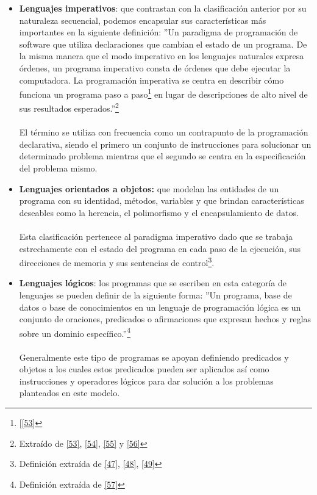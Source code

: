 \begin{itemize}
        \item  \textbf{Lenguajes imperativos}: que contrastan con la clasificación anterior por su naturaleza secuencial, podemos encapsular sus características más importantes en la siguiente definición: 
         ''Un paradigma de programación de software que utiliza declaraciones que cambian el estado de un programa. De la misma manera que el modo imperativo en los lenguajes naturales expresa órdenes, un programa imperativo consta de órdenes que debe ejecutar la computadora. La programación imperativa se centra en describir cómo funciona un programa paso a paso\footnote{[\hyperlink{53}{[53]}} en lugar de descripciones de alto nivel de sus resultados esperados.''\footnote{Extraído de \hyperlink{53}{[53]}, \hyperlink{54}{[54]}, \hyperlink{55}{[55]} y \hyperlink{56}{[56]}}\\\\
        El término se utiliza con frecuencia como un contrapunto de la programación declarativa, siendo el primero un conjunto de instrucciones para solucionar un determinado problema mientras que el segundo se centra en la especificación del problema mismo.\\

        \item \textbf{Lenguajes orientados a objetos:} que modelan las entidades de un programa con su identidad, métodos, variables y que brindan características deseables como la herencia, el polimorfismo y el encapsulamiento de datos.\\\\
        Esta clasificación pertenece al paradigma imperativo dado que se trabaja estrechamente con el estado del programa en cada paso de la ejecución, sus direcciones de memoria y sus sentencias de control\footnote{Definición extraída de \hyperlink{47}{[47]}, \hyperlink{48}{[48]}, \hyperlink{49}{[49]}}.\\
    
        \item \textbf{Lenguajes lógicos}: los programas que se escriben en esta categoría de lenguajes se pueden definir de la siguiente forma:  ''Un programa, base de datos o base de conocimientos en un lenguaje de programación lógica es un conjunto de oraciones, predicados o afirmaciones que expresan hechos y reglas sobre un dominio específico.''\footnote{Definición extraída de \hyperlink{57}{[57]}} \\\\
        Generalmente este tipo de programas se apoyan definiendo predicados y objetos a los cuales estos predicados pueden ser aplicados así como instrucciones y operadores lógicos para dar solución a los problemas planteados en este modelo.

    
    \end{itemize}


